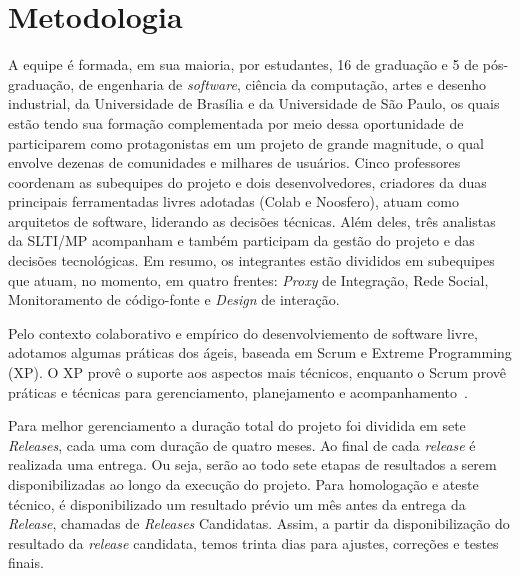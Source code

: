 \section{Metodologia}
\label{sec:metodologia}

A equipe é formada, em sua maioria, por estudantes, 16 de graduação e 5 de
pós-graduação, de engenharia de \textit{software}, ciência da computação, artes
e desenho industrial, da Universidade de Brasília e da Universidade de São
Paulo, os quais estão tendo sua formação complementada por meio dessa
oportunidade de participarem como protagonistas em um projeto de grande
magnitude, o qual envolve dezenas de comunidades e milhares de usuários.
%
Cinco professores coordenam as subequipes do projeto e dois desenvolvedores,
criadores da duas principais ferramentadas livres adotadas (Colab e Noosfero), atuam como
arquitetos de software, liderando as decisões técnicas.
%
Além deles, três analistas da SLTI/MP acompanham e também participam da gestão
do projeto e das decisões tecnológicas.
%
Em resumo, os integrantes estão divididos em subequipes que atuam, no momento,
em quatro frentes: \emph{Proxy} de Integração, Rede Social, Monitoramento de
código-fonte e \textit{Design} de interação.

Pelo contexto colaborativo e empírico do desenvolviemento de software livre,
adotamos algumas práticas dos ágeis, baseada em Scrum e Extreme Programming (XP).
%
O XP provê o suporte aos aspectos mais técnicos, enquanto o Scrum provê
práticas e técnicas para gerenciamento, planejamento e
acompanhamento~\cite{schwaber2001,fitzgerald2006}. 



Para melhor gerenciamento a duração total do projeto foi dividida em sete \textit{Releases}, cada uma com duração de quatro meses. Ao final de cada \textit{release} é realizada uma entrega. Ou seja, serão ao todo sete etapas de resultados a serem disponibilizadas ao longo da execução do projeto.
Para homologação e ateste técnico, é disponibilizado um resultado prévio um mês antes da entrega da \textit{Release}, chamadas de \textit{Releases} Candidatas. Assim, a partir da disponibilização do resultado da \textit{release} candidata, temos trinta dias para ajustes, correções e testes finais. 

